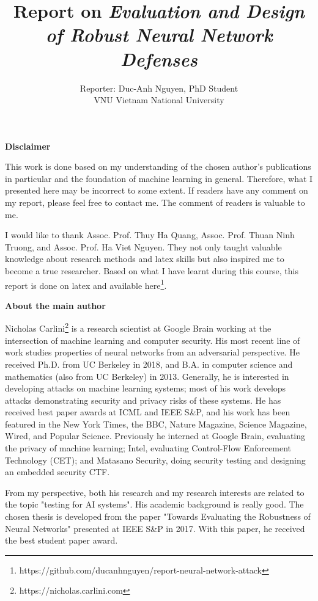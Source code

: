 \documentclass[12pt]{article}
\title{Report on \textit{Evaluation and Design of Robust Neural Network Defenses}}
\author{Reporter: Duc-Anh Nguyen, PhD Student\\VNU Vietnam National University}
\date{}
\begin{document}
	\begin{titlepage}
		
	\end{titlepage}

\newpage
\begin{center}
	\textbf{Disclaimer}
\end{center}
This work is done based on my understanding of the chosen author's publications in particular and the foundation of machine learning in general. Therefore, what I presented here may be incorrect to some extent. If readers have any comment on my report, please feel free to contact me. The comment of readers is valuable to me.

I would like to thank Assoc. Prof. Thuy Ha Quang, Assoc. Prof. Thuan Ninh Truong, and Assoc. Prof. Ha Viet Nguyen.  They not only taught valuable knowledge about research methods and latex skills but also inspired me to become a true researcher. Based on what  I have learnt during this course, this report is done on latex and available here\footnote{https://github.com/ducanhnguyen/report-neural-network-attack}.

\newpage
\begin{center}
	\textbf{About the main author}
\end{center}

Nicholas Carlini\footnote{https://nicholas.carlini.com} is a research scientist at Google Brain working at the intersection of machine learning and computer security. His most recent line of work studies properties of neural networks from an adversarial perspective. He received Ph.D. from UC Berkeley in 2018, and B.A. in computer science and mathematics (also from UC Berkeley) in 2013. 
Generally, he is interested in developing attacks on machine learning systems; most of his work develops attacks demonstrating security and privacy risks of these systems. He has received best paper awards at ICML and IEEE S\&P, and his work has been featured in the New York Times, the BBC, Nature Magazine, Science Magazine, Wired, and Popular Science. 
Previously he interned at Google Brain, evaluating the privacy of machine learning; Intel, evaluating Control-Flow Enforcement Technology (CET); and Matasano Security, doing security testing and designing an embedded security CTF.

From my perspective, both his research and my research interests are related to the topic "testing for AI systems". His academic background is really good. The chosen thesis is developed from the paper "Towards Evaluating the Robustness of Neural Networks" presented at IEEE S\&P in 2017. With this paper, he received the best student paper award.
\end{document}
